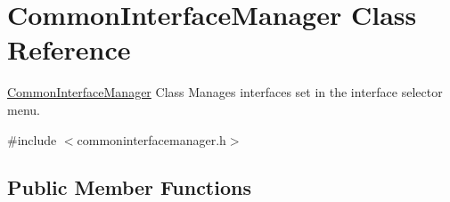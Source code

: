 \hypertarget{class_common_interface_manager}{}\section{Common\+Interface\+Manager Class Reference}
\label{class_common_interface_manager}


\hyperlink{class_common_interface_manager}{Common\+Interface\+Manager} Class Manages interfaces set in the interface selector menu.  




{\ttfamily \#include $<$commoninterfacemanager.\+h$>$}

\subsection*{Public Member Functions}
